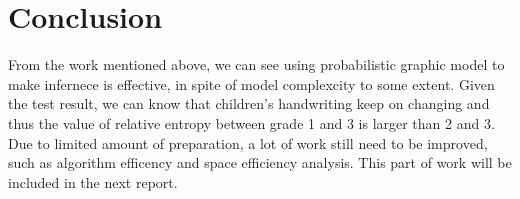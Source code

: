 \documentclass{article}
\begin{document}
\section{Conclusion} 
From the work mentioned above, we can see using probabilistic graphic model
to make infernece is effective, in spite of model complexcity to some extent.
Given the test result, we can know that children's handwriting keep on changing
and thus the value of relative entropy between grade 1 and 3 is larger than
2 and 3.
\\Due to limited amount of preparation,  a lot of work still need to
be improved, such as algorithm efficency and space efficiency analysis. This
part of work will be included in the next report.

 
 


\nocite{langley00}
\end{document}

